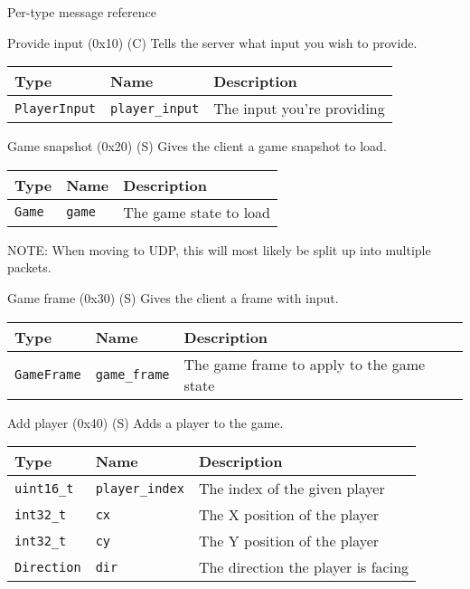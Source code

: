 \documentclass[a4paper,draft]{article}
\begin{document}
\begin{section}{Per-type message reference}
  \begin{subsection}{Provide input (0x10) (C)}
    Tells the server what input you wish to provide.

    \begin{tabular}{lll}
      \hline
      Type & Name & Description \\
      \hline
      \texttt{PlayerInput} & \texttt{player\_input} & The input you're providing \\
      \hline
    \end{tabular}
  \end{subsection}

  \begin{subsection}{Game snapshot (0x20) (S)}
    Gives the client a game snapshot to load.

    \begin{tabular}{lll}
      \hline
      Type & Name & Description \\
      \hline
      \texttt{Game} & \texttt{game} & The game state to load\\
      \hline
    \end{tabular}

    NOTE: When moving to UDP, this will most likely be split up into multiple packets.
  \end{subsection}

  \begin{subsection}{Game frame (0x30) (S)}
    Gives the client a frame with input.

    \begin{tabular}{lll}
      \hline
      Type & Name & Description \\
      \hline
      \texttt{GameFrame} & \texttt{game\_frame} & The game frame to apply to the game state \\
      \hline
    \end{tabular}
  \end{subsection}

  \begin{subsection}{Add player (0x40) (S)}
    Adds a player to the game.

    \begin{tabular}{lll}
      \hline
      Type & Name & Description \\
      \hline
      \texttt{uint16\_t} & \texttt{player\_index} & The index of the given player \\
      \texttt{int32\_t} & \texttt{cx} & The X position of the player \\
      \texttt{int32\_t} & \texttt{cy} & The Y position of the player \\
      \texttt{Direction} & \texttt{dir} & The direction the player is facing \\
      \hline
    \end{tabular}
  \end{subsection}
\end{section}
\end{document}
